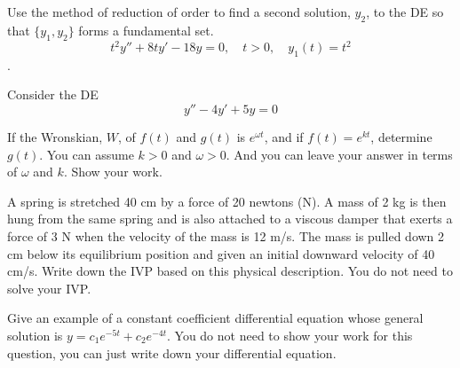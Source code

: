 \documentclass[12pt]{exam}
\begin{document}
    


\newpage

\begin{questions}

\question[5] Use the method of reduction of order to find a second solution, $y_2$, to the DE so that $\{y_1,y_2\}$ forms a fundamental set. $$ t^2y'' +8t y' - 18y = 0, \quad t>0, \quad y_1(t) = t^2$$. 

\newpage 
\question[5] Consider the DE $$y''-4y'+5y = 0$$
    
\newpage

\question[4] If the Wronskian, $W$, of $f(t)$ and $g(t)$ is $e^{\omega t}$, and if $f(t) = e^{kt}$, determine $g(t)$. You can assume $k>0$ and $\omega>0$. And you can leave your answer in terms of $\omega$ and $k$. Show your work. 

\newpage 

\question[3] A spring is stretched 40 cm by a force of 20 newtons (N). A mass of 2 kg is then hung from the same spring and is also attached to a viscous damper that exerts a force of 3 N when the velocity of the mass is 12 m/s. The mass is pulled down 2 cm below its equilibrium position and given an initial downward velocity of 40 cm/s. Write down the IVP based on this physical description. You do not need to solve your IVP. 

\vspace{8cm}

\question[2] Give an example of a constant coefficient differential equation whose general solution is $y = c_1 e^{-5t} + c_2 e^{-4t}$. You do not need to show your work for this question, you can just write down your differential equation. 






\end{questions}
\end{document}
